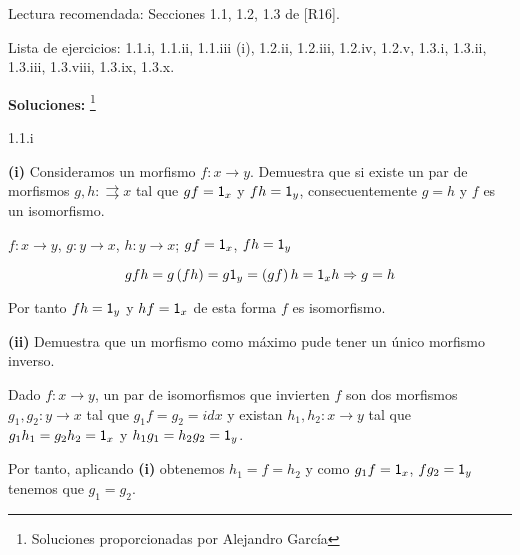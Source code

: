Lectura recomendada: Secciones 1.1, 1.2, 1.3 de [R16].

Lista de ejercicios: 1.1.i, 1.1.ii, 1.1.iii (i), 1.2.ii, 1.2.iii, 1.2.iv, 1.2.v, 1.3.i, 1.3.ii, 1.3.iii, 1.3.viii, 1.3.ix, 1.3.x.

{\bf Soluciones: }\footnote{Soluciones proporcionadas por Alejandro García}

\begin{Ej}\label{ej:1.1.i}
   1.1.i


   {\bf (i)} Consideramos un morfismo $f \colon x \rightarrow y$. Demuestra que si existe un par de morfismos $g,h \colon \rightrightarrows x$ tal que $gf=\textup{\textsf{1}}_{x}$ y $fh=\textup{\textsf{1}}_{y}$,  consecuentemente $g=h$ y $f$ es un isomorfismo.

   $f \colon x \rightarrow y$, $g \colon y \rightarrow x$, $h \colon y \rightarrow x$; $gf=\textup{\textsf{1}}_{x}$, $fh=\textup{\textsf{1}}_{y}$ 

\begin{equation*}
gfh = g \left( fh\right) = g \textup{\textsf{1}}_{y} = \left(gf\right) h = \textup{\textsf{1}}_{x}h \Rightarrow g=h
\end{equation*}


  Por tanto $fh=\textup{\textsf{1}}_{y}$ y $hf=\textup{\textsf{1}}_{x}$ de esta forma $f$ es isomorfismo. 
  
  {\bf (ii)} Demuestra que un morfismo como máximo pude tener un único morfismo inverso.  

  Dado $f \colon x \rightarrow y$, un par de isomorfismos que invierten $f$ son dos morfismos $g_1,g_2 \colon y \rightarrow x $ tal que $g_1f=g_2=id{x}$ y existan $h_1,h_2 \colon x \rightarrow y$ tal que $g_1 h_1=g_2h_2=\textup{\textsf{1}}_{x}$ y $h_1g_1=h_2g_2=\textup{\textsf{1}}_{y}$. 

  Por tanto, aplicando {\bf (i)} obtenemos $h_1=f=h_2$ y como $g_1f=\textup{\textsf{1}}_{x}$, $fg_2=\textup{\textsf{1}}_{y}$ tenemos que $g_1=g_2$.



\end{Ej}
